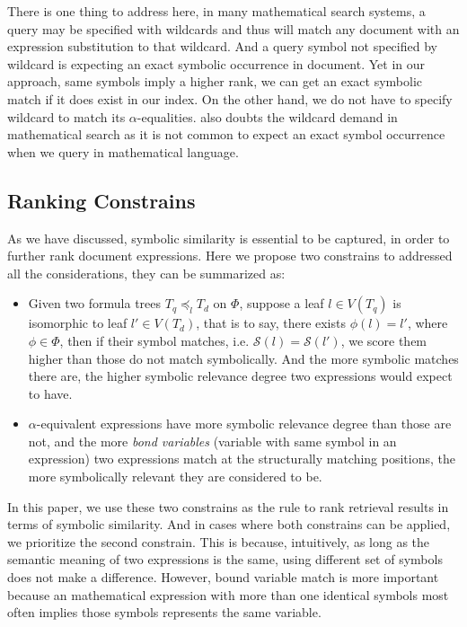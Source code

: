 There is one thing to address here, in many mathematical search systems, a query may be specified with wildcards and thus will match any document with an expression substitution to that wildcard. 
And a query symbol not specified by wildcard is expecting an exact symbolic occurrence in document.
Yet in our approach, same symbols imply a higher rank, we can get an exact symbolic match if it does exist in our index. 
On the other hand, we do not have to specify wildcard to match its $\alpha$-equalities.
\cite{mias11a} also doubts the wildcard demand in mathematical search as it is not common to expect an exact symbol occurrence when we query in mathematical language.

\subsection{Ranking Constrains}
As we have discussed, symbolic similarity is essential to be captured, in order to further rank document expressions. 
Here we propose two constrains to addressed all the considerations, they can be summarized as:

\begin{itemize}
\item Given two formula trees
$T_q \preceq_l T_d$ on $\Phi$,  
suppose a leaf $l \in V(T_q)$ is isomorphic to leaf $l' \in V(T_d)$, that is to say, there exists $\phi(l)=l'$, where $\phi \in \Phi$, then if their symbol matches, i.e. $\mathcal{S}(l) = \mathcal{S}(l')$, we score them higher than those do not match symbolically. And the more symbolic matches there are, the higher symbolic relevance degree two expressions would expect to have.
\item $\alpha$-equivalent expressions have more symbolic relevance degree than those are not, and the more \textit{bond variables} (variable with same symbol in an expression) two expressions match at the structurally matching positions, the more symbolically relevant they are considered to be.
\end{itemize}

In this paper, we use these two constrains as the rule to rank retrieval results in terms of symbolic similarity.
And in cases where both constrains can be applied, we prioritize the second constrain. 
This is because, intuitively, as long as the semantic meaning of two expressions is the same, using different set of symbols does not make a difference. 
However, bound variable match is more important because an mathematical expression with more than one identical symbols most often implies those symbols represents the same variable. 

